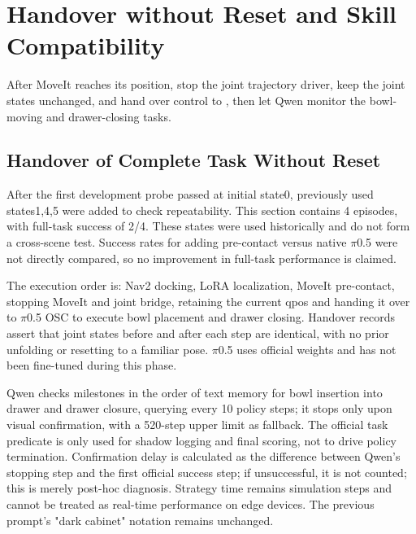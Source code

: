 \FloatBarrier

\section{Handover without Reset \pifive{} and Skill Compatibility}

\label{stage:s20}

After MoveIt reaches its position, stop the joint trajectory driver, keep the joint states unchanged, and hand over control to \pifive{}, then let Qwen monitor the bowl-moving and drawer-closing tasks.

\subsection{Handover of Complete Task Without Reset}\label{s20-detail-1}

After the first development probe passed at initial state0, previously used states1,4,5 were added to check repeatability. This section contains 4 episodes, with full-task success of 2/4. These states were used historically and do not form a cross-scene test. Success rates for adding pre-contact versus native \(\pi\)0.5 were not directly compared, so no improvement in full-task performance is claimed.

The execution order is: Nav2 docking, LoRA localization, MoveIt pre-contact, stopping MoveIt and joint bridge, retaining the current qpos and handing it over to \(\pi\)0.5 OSC to execute bowl placement and drawer closing. Handover records assert that joint states before and after each step are identical, with no prior unfolding or resetting to a familiar pose. \(\pi\)0.5 uses official weights and has not been fine-tuned during this phase.

Qwen checks milestones in the order of text memory for bowl insertion into drawer and drawer closure, querying every 10 policy steps; it stops only upon visual confirmation, with a 520-step upper limit as fallback. The official task predicate is only used for shadow logging and final scoring, not to drive policy termination. Confirmation delay is calculated as the difference between Qwen's stopping step and the first official success step; if unsuccessful, it is not counted; this is merely post-hoc diagnosis. Strategy time remains simulation steps and cannot be treated as real-time performance on edge devices. The previous prompt's "dark cabinet" notation remains unchanged.

